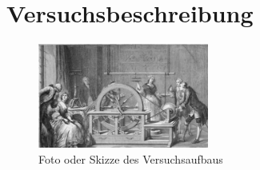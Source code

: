 \section{Versuchsbeschreibung}
\label{section:Versuchsbeschreibung}
%
\begin{figure}[!ht]
		\centering
		\includegraphics[width=0.5\textwidth]{Abbildungen/Beispielbild_Versuchsaufbau.eps}
		\caption{Foto oder Skizze des Versuchsaufbaus}
		\label{fig:BspVers}
\end{figure}
%
